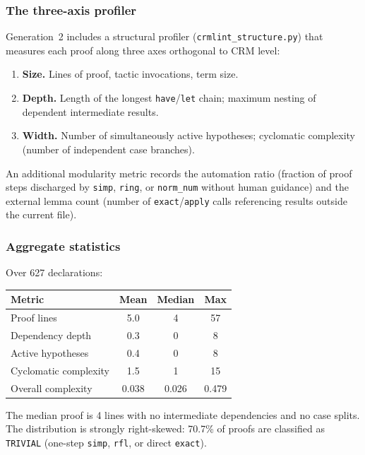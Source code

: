 \subsubsection{The three-axis profiler}\label{sec:three-axis}

Generation~2 includes a structural profiler (\texttt{crmlint\_structure.py})
that measures each proof along three axes orthogonal to CRM level:

\begin{enumerate}[label=\textbf{Axis \arabic*:}]
\item \textbf{Size.} Lines of proof, tactic invocations, term size.
\item \textbf{Depth.} Length of the longest \texttt{have}/\texttt{let}
  chain; maximum nesting of dependent intermediate results.
\item \textbf{Width.} Number of simultaneously active hypotheses;
  cyclomatic complexity (number of independent case branches).
\end{enumerate}

An additional modularity metric records the automation ratio (fraction
of proof steps discharged by \texttt{simp}, \texttt{ring}, or
\texttt{norm\_num} without human guidance) and the external lemma
count (number of \texttt{exact}/\texttt{apply} calls referencing
results outside the current file).

\subsubsection{Aggregate statistics}\label{sec:aggregate-stats}

Over 627 declarations:

\begin{center}
\begin{tabular}{lccc}
\toprule
\textbf{Metric} & \textbf{Mean} & \textbf{Median} & \textbf{Max} \\
\midrule
Proof lines          &  5.0 &  4 & 57 \\
Dependency depth     &  0.3 &  0 &  8 \\
Active hypotheses    &  0.4 &  0 &  8 \\
Cyclomatic complexity & 1.5 &  1 & 15 \\
Overall complexity   & 0.038 & 0.026 & 0.479 \\
\bottomrule
\end{tabular}
\end{center}

The median proof is 4 lines with no intermediate dependencies and no
case splits.  The distribution is strongly right-skewed: 70.7\% of
proofs are classified as \texttt{TRIVIAL} (one-step \texttt{simp},
\texttt{rfl}, or direct \texttt{exact}).

